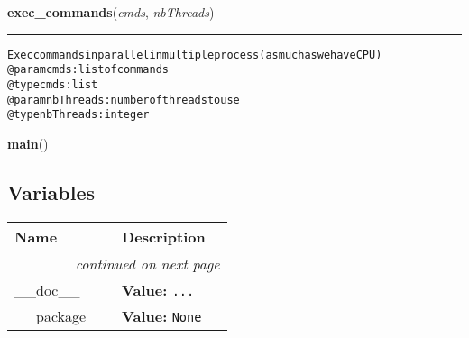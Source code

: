     \label{script-iVCFmaker:exec_commands}

    \vspace{0.5ex}

\hspace{.8\funcindent}\begin{boxedminipage}{\funcwidth}

    \raggedright \textbf{exec\_commands}(\textit{cmds}, \textit{nbThreads})

    \vspace{-1.5ex}

    \rule{\textwidth}{0.5\fboxrule}
\setlength{\parskip}{2ex}
\begin{alltt}

Exec commands in parallel in multiple process (as much as we have CPU)
@param cmds: list of commands
    @type cmds: list
    @param nbThreads: number of threads to use
    @type nbThreads: integer
\end{alltt}

\setlength{\parskip}{1ex}
    \end{boxedminipage}

    \label{script-iVCFmaker:main}

    \vspace{0.5ex}

\hspace{.8\funcindent}\begin{boxedminipage}{\funcwidth}

    \raggedright \textbf{main}()

\setlength{\parskip}{2ex}
\setlength{\parskip}{1ex}
    \end{boxedminipage}



  \subsection{Variables}

    \vspace{-1cm}
\hspace{\varindent}\begin{longtable}{|p{\varnamewidth}|p{\vardescrwidth}|l}
\cline{1-2}
\cline{1-2} \centering \textbf{Name} & \centering \textbf{Description}& \\
\cline{1-2}
\endhead\cline{1-2}\multicolumn{3}{r}{\small\textit{continued on next page}}\\\endfoot\cline{1-2}
\endlastfoot\raggedright \_\-\_\-d\-o\-c\-\_\-\_\- & \raggedright \textbf{Value:} 
{\tt \texttt{...}}&\\
\cline{1-2}
\raggedright \_\-\_\-p\-a\-c\-k\-a\-g\-e\-\_\-\_\- & \raggedright \textbf{Value:} 
{\tt None}&\\
\cline{1-2}
\end{longtable}

